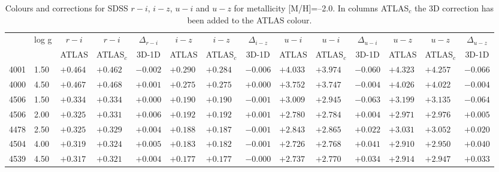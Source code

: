 \documentclass[]{aa}
\def\teff{$T\rm_{eff}$}
\begin{document}
\begin{appendix}
\begin{table*}
\caption{\label{SDSS_2_m20}
Colours and corrections for  SDSS $r-i$, $i-z$, $u-i$ and $u-z$ for metallicity [M/H]=--2.0. In columns ATLAS$_c$ the 3D correction
has been added to the ATLAS colour.  }
\renewcommand{\tabcolsep}{3pt}
\tabskip=0pt
\begin{center}
\begin{tabular}{llllllllllllll}
\hline\noalign{\smallskip}
\multicolumn{1}{c}{\teff} & 
\multicolumn{1}{c}{log g} & 
\multicolumn{1}{c}{$r-i$} &
\multicolumn{1}{c}{$r-i$} &
\multicolumn{1}{c}{$\Delta_{r-i}$} &
\multicolumn{1}{c}{$i-z$} &
\multicolumn{1}{c}{$i-z$} &
\multicolumn{1}{c}{$\Delta_{i-z}$} &
\multicolumn{1}{c}{$u-i$} &
\multicolumn{1}{c}{$u-i$} &
\multicolumn{1}{c}{$\Delta_{u-i}$} & 
\multicolumn{1}{c}{$u-z$} &
\multicolumn{1}{c}{$u-z$} &
\multicolumn{1}{c}{$\Delta_{u-z}$} \\
\multicolumn{2}{c}{ } &  
\multicolumn{1}{c}{ATLAS} &
\multicolumn{1}{c}{ATLAS$_c$}&
\multicolumn{1}{c}{3D-1D}&
\multicolumn{1}{c}{ATLAS} &
\multicolumn{1}{c}{ATLAS$_c$}&
\multicolumn{1}{c}{3D-1D}&
\multicolumn{1}{c}{ATLAS} &
\multicolumn{1}{c}{ATLAS$_c$}&
\multicolumn{1}{c}{3D-1D}&
\multicolumn{1}{c}{ATLAS} &
\multicolumn{1}{c}{ATLAS$_c$}&
\multicolumn{1}{c}{3D-1D} \\
\hline\noalign{\smallskip}
\hline\noalign{\smallskip}
4001  &1.50 & $+0.464$ & $+0.462$ & $-0.002$ & $+0.290$ & $+0.284$ & $-0.006$ & $+4.033$ & $+3.974$ & $-0.060$ & $+4.323$ & $+4.257$ & $-0.066$ \\
4000  &4.50 & $+0.467$ & $+0.468$ & $+0.001$ & $+0.275$ & $+0.275$ & $+0.000$ & $+3.752$ & $+3.747$ & $-0.004$ & $+4.026$ & $+4.022$ & $-0.004$ \\
4506  &1.50 & $+0.334$ & $+0.334$ & $+0.000$ & $+0.190$ & $+0.190$ & $-0.001$ & $+3.009$ & $+2.945$ & $-0.063$ & $+3.199$ & $+3.135$ & $-0.064$ \\
4506  &2.00 & $+0.325$ & $+0.331$ & $+0.006$ & $+0.192$ & $+0.192$ & $+0.001$ & $+2.780$ & $+2.784$ & $+0.004$ & $+2.971$ & $+2.976$ & $+0.005$ \\
4478  &2.50 & $+0.325$ & $+0.329$ & $+0.004$ & $+0.188$ & $+0.187$ & $-0.001$ & $+2.843$ & $+2.865$ & $+0.022$ & $+3.031$ & $+3.052$ & $+0.020$ \\
4504  &4.00 & $+0.319$ & $+0.324$ & $+0.005$ & $+0.183$ & $+0.182$ & $-0.001$ & $+2.726$ & $+2.768$ & $+0.041$ & $+2.910$ & $+2.950$ & $+0.040$ \\
4539  &4.50 & $+0.317$ & $+0.321$ & $+0.004$ & $+0.177$ & $+0.177$ & $-0.000$ & $+2.737$ & $+2.770$ & $+0.034$ & $+2.914$ & $+2.947$ & $+0.033$ \\

\end{tabular}
\end{center}
\end{table*}
\end{appendix}
\end{document}
